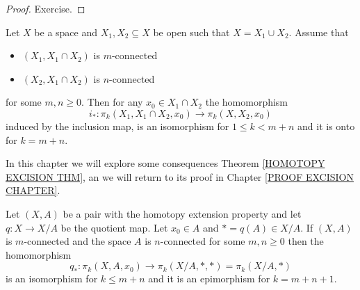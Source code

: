 \begin{proof}
Exercise.
\end{proof}


\begin{HOMOTEXCISIONTHM}
\label{HOMOTOPY  EXCISION THM}
Let $X$ be a space and
$X_{1}, X_{2}\subseteq X$ be open such that 
$X=  X_{1}\cup X_{2}$. Assume that 
\begin{itemize}
\item $(X_{1}, X_{1}\cap X_{2})$ is $m$-connected 
\item $(X_{2}, X_{1}\cap X_{2})$ is $n$-connected 
\end{itemize}
for some $m, n \geq 0$. Then for any $x_{0}\in X_{1}\cap X_{2}$ the homomorphism 
\[
i_{\ast}\colon \pi_{k}(X_{1}, X_{1}\cap X_{2}, x_{0}) \to \pi_{k}(X, X_{2}, x_{0})
\]
induced by  the inclusion map, is an isomorphism for $1 \leq k < m+n$ and 
it is onto for $k = m+n$.
\end{HOMOTEXCISIONTHM}

In this chapter we will explore some consequences Theorem \ref{HOMOTOPY  EXCISION THM}, 
an we will return to its proof in Chapter \ref{PROOF EXCISION CHAPTER}.


\begin{proposition}
\label{PIK QUOTIENT PROP}
Let $(X, A)$ be a pair with the homotopy extension property and let 
$q\colon X \to X/A$ be the quotient map. Let $x_{0}\in A$ and 
$\ast = q(A) \in X/A$. If $(X, A)$  is $m$-connected
and the space $A$ is $n$-connected for some $m, n \geq 0$ then the homomorphism 
\[
q_{\ast}\colon \pi_{k}(X, A, x_{0}) \to \pi_{k}(X/A, \ast, \ast) = \pi_{k}(X/A, \ast)
\]
is an isomorphism for $k \leq m+n$ and it is an epimorphism for $k = m+n+1$. 
\end{proposition}

